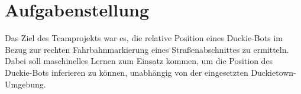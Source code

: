 \section{Aufgabenstellung}

Das Ziel des Teamprojekts war es, die relative Position eines Duckie-Bots im Bezug zur rechten Fahrbahnmarkierung eines Straßenabschnittes zu ermitteln. Dabei soll maschinelles Lernen zum Einsatz kommen, um die Position des Duckie-Bots inferieren zu können, unabhängig von der eingesetzten Duckietown-Umgebung. 


